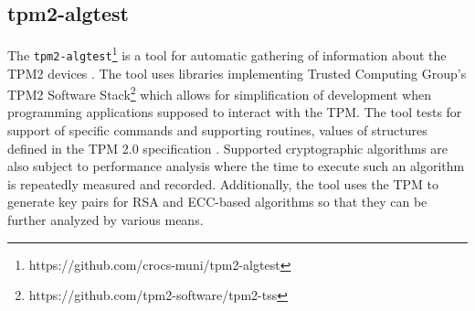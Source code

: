 \subsection{tpm2-algtest}
The \texttt{tpm2-algtest}\footnote{https://github.com/crocs-muni/tpm2-algtest} is a tool for automatic gathering of information about the TPM2 devices \cite{Struk2019thesis}. The tool uses libraries implementing Trusted Computing Group's TPM2 Software Stack\footnote{https://github.com/tpm2-software/tpm2-tss} which allows for simplification of development when programming applications supposed to interact with the TPM. The tool tests for support of specific commands and supporting routines, values of structures defined in the TPM 2.0 specification \cite{tcg_p3_commands, tcg_p4_supproutines, tcg_p2_structures}. Supported cryptographic algorithms are also subject to performance analysis where the time to execute such an algorithm is repeatedly measured and recorded. Additionally, the tool uses the TPM to generate key pairs for RSA and ECC-based algorithms so that they can be further analyzed by various means.
